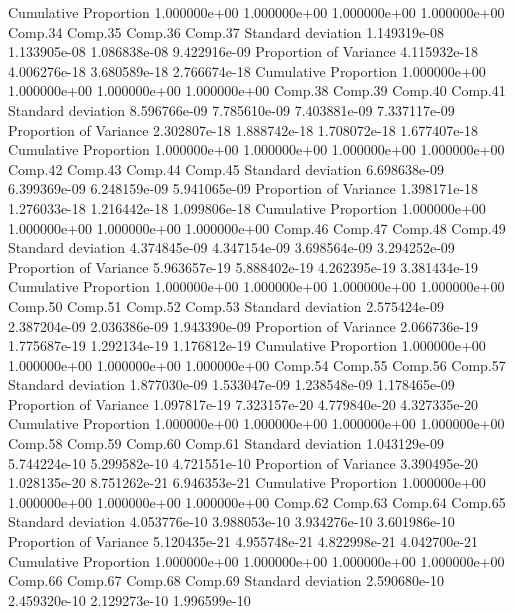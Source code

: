 \documentclass[12pt]{article}
\begin{document}
\begin{Schunk}
\begin{Soutput}
Cumulative Proportion  1.000000e+00 1.000000e+00 1.000000e+00 1.000000e+00
                            Comp.34      Comp.35      Comp.36      Comp.37
Standard deviation     1.149319e-08 1.133905e-08 1.086838e-08 9.422916e-09
Proportion of Variance 4.115932e-18 4.006276e-18 3.680589e-18 2.766674e-18
Cumulative Proportion  1.000000e+00 1.000000e+00 1.000000e+00 1.000000e+00
                            Comp.38      Comp.39      Comp.40      Comp.41
Standard deviation     8.596766e-09 7.785610e-09 7.403881e-09 7.337117e-09
Proportion of Variance 2.302807e-18 1.888742e-18 1.708072e-18 1.677407e-18
Cumulative Proportion  1.000000e+00 1.000000e+00 1.000000e+00 1.000000e+00
                            Comp.42      Comp.43      Comp.44      Comp.45
Standard deviation     6.698638e-09 6.399369e-09 6.248159e-09 5.941065e-09
Proportion of Variance 1.398171e-18 1.276033e-18 1.216442e-18 1.099806e-18
Cumulative Proportion  1.000000e+00 1.000000e+00 1.000000e+00 1.000000e+00
                            Comp.46      Comp.47      Comp.48      Comp.49
Standard deviation     4.374845e-09 4.347154e-09 3.698564e-09 3.294252e-09
Proportion of Variance 5.963657e-19 5.888402e-19 4.262395e-19 3.381434e-19
Cumulative Proportion  1.000000e+00 1.000000e+00 1.000000e+00 1.000000e+00
                            Comp.50      Comp.51      Comp.52      Comp.53
Standard deviation     2.575424e-09 2.387204e-09 2.036386e-09 1.943390e-09
Proportion of Variance 2.066736e-19 1.775687e-19 1.292134e-19 1.176812e-19
Cumulative Proportion  1.000000e+00 1.000000e+00 1.000000e+00 1.000000e+00
                            Comp.54      Comp.55      Comp.56      Comp.57
Standard deviation     1.877030e-09 1.533047e-09 1.238548e-09 1.178465e-09
Proportion of Variance 1.097817e-19 7.323157e-20 4.779840e-20 4.327335e-20
Cumulative Proportion  1.000000e+00 1.000000e+00 1.000000e+00 1.000000e+00
                            Comp.58      Comp.59      Comp.60      Comp.61
Standard deviation     1.043129e-09 5.744224e-10 5.299582e-10 4.721551e-10
Proportion of Variance 3.390495e-20 1.028135e-20 8.751262e-21 6.946353e-21
Cumulative Proportion  1.000000e+00 1.000000e+00 1.000000e+00 1.000000e+00
                            Comp.62      Comp.63      Comp.64      Comp.65
Standard deviation     4.053776e-10 3.988053e-10 3.934276e-10 3.601986e-10
Proportion of Variance 5.120435e-21 4.955748e-21 4.822998e-21 4.042700e-21
Cumulative Proportion  1.000000e+00 1.000000e+00 1.000000e+00 1.000000e+00
                            Comp.66      Comp.67      Comp.68      Comp.69
Standard deviation     2.590680e-10 2.459320e-10 2.129273e-10 1.996599e-10

\end{Soutput}
\end{Schunk}
\end{document}
